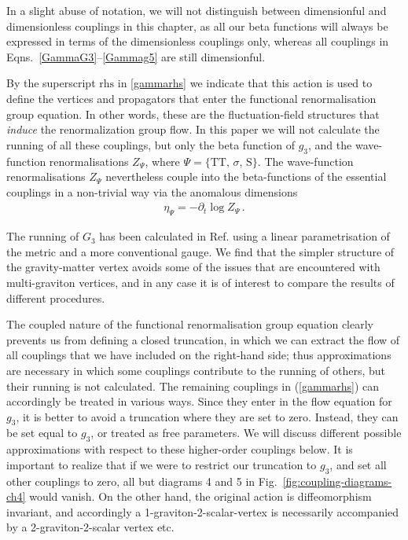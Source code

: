 \documentclass[11pt]{book}
\numberwithin{equation}{chapter}
\begin{document}
In a slight abuse of notation, we will not distinguish between dimensionful and dimensionless couplings in
this chapter,
as all our beta functions will always be expressed in terms of the dimensionless couplings only,
whereas all couplings in Eqns.~\eqref{GammaG3}--\eqref{Gammag5} are still dimensionful.

By the superscript $\mathrm{rhs}$ in \eqref{gammarhs} we indicate that this action is used to define the
vertices and propagators that enter the functional renormalisation group equation.
In other words, these are the fluctuation-field structures that \emph{induce} the renormalization group flow.
In this paper we will not calculate the running of all these couplings, but only the beta function
of $g_3$, and the wave-function renormalisations $Z_\Psi$, where $\Psi = \{ \mathrm{TT}, \, \sigma, \, \mathrm S \}$.
The wave-function renormalisations $Z_\Psi$ nevertheless couple into the beta-functions of the
essential couplings in a non-trivial way via the anomalous dimensions
\begin{align}
  \eta_\Psi = - \partial_t \log Z_\Psi \,.
\end{align}

The running of $G_3$ has been calculated in Ref. \cite{Meibohm:2015twa} using a linear
parametrisation of the metric and a more conventional gauge.
We find that the simpler structure of the gravity-matter vertex avoids some of the issues that
are encountered with multi-graviton vertices,
and in any case it is of interest to compare the results of different procedures.

The coupled nature of the functional renormalisation group equation clearly prevents
us from defining a closed truncation,
in which we can extract the flow of all couplings that we have included on the right-hand side;
thus approximations are necessary in which some couplings contribute to the running of others,
but their running is not calculated.
The remaining couplings in (\ref{gammarhs}) can accordingly be treated in various ways.
Since they enter in the flow equation for $g_3$,
it is better to avoid a truncation where they are set to zero.
Instead, they can be set equal to $g_3$, or treated as free parameters.
We will discuss different possible approximations with respect to these higher-order couplings below.
It is important to realize that if we were to restrict our truncation to $g_3$,
and set all other couplings to zero,
all but diagrams 4 and 5 in Fig.~\ref{fig:coupling-diagrams-ch4} would vanish.
On the other hand, the original action is diffeomorphism invariant,
and accordingly a 1-graviton-2-scalar-vertex is necessarily
accompanied by a 2-graviton-2-scalar vertex etc.
\end{document}
